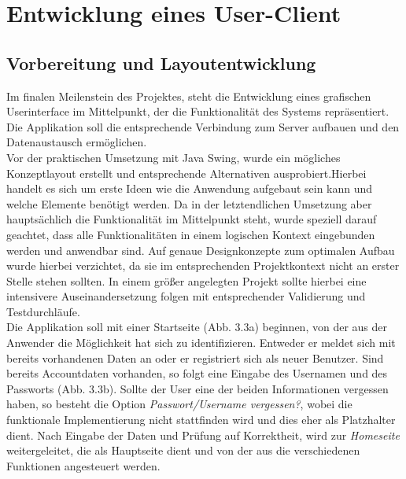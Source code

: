 

\section{Entwicklung eines User-Client}

\subsection{Vorbereitung und Layoutentwicklung}
Im finalen Meilenstein des Projektes, steht die Entwicklung eines grafischen Userinterface im Mittelpunkt, der die Funktionalität des Systems repräsentiert. Die Applikation soll die entsprechende Verbindung zum Server aufbauen und den Datenaustausch ermöglichen. \\

Vor der praktischen Umsetzung mit Java Swing, wurde ein mögliches Konzeptlayout erstellt und entsprechende Alternativen ausprobiert.Hierbei handelt es sich um erste Ideen wie die Anwendung aufgebaut sein kann und welche Elemente benötigt werden.
Da in der letztendlichen Umsetzung aber hauptsächlich die Funktionalität im Mittelpunkt steht, wurde speziell darauf geachtet, dass alle Funktionalitäten in einem logischen Kontext eingebunden werden und anwendbar sind. Auf genaue Designkonzepte zum optimalen Aufbau wurde hierbei verzichtet, da sie im entsprechenden Projektkontext nicht an erster Stelle stehen sollten. In einem größer angelegten Projekt sollte hierbei eine intensivere Auseinandersetzung folgen mit entsprechender Validierung und Testdurchläufe. \\

Die Applikation soll mit einer Startseite (Abb. 3.3a) beginnen, von der aus der Anwender die Möglichkeit hat sich zu identifizieren. Entweder er meldet sich mit bereits vorhandenen Daten an oder er registriert sich als neuer Benutzer.
Sind bereits Accountdaten vorhanden, so folgt eine Eingabe des Usernamen und des Passworts (Abb. 3.3b). Sollte der User eine der beiden Informationen vergessen haben, so besteht die Option \textit{Passwort/Username vergessen?}, wobei die funktionale Implementierung nicht stattfinden wird und dies eher als Platzhalter dient. Nach Eingabe der Daten und Prüfung auf Korrektheit, wird zur \textit{Homeseite} weitergeleitet, die als Hauptseite dient und von der aus die verschiedenen Funktionen angesteuert werden.

